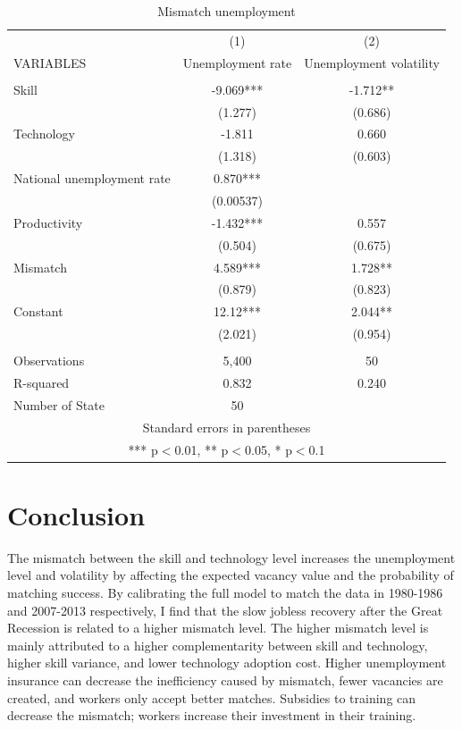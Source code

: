 \documentclass[12pt]{article}
\newcommand{\1}{\mathbb{1}}
\begin{document}
\begin{table}[h!]
\centering
\caption{Mismatch unemployment}
\label{unemployment}
\begin{tabular}{lcc} \hline \hline
 & (1) & (2) \\
VARIABLES & Unemployment rate & Unemployment volatility \\ \hline
 &  &  \\
Skill & -9.069*** & -1.712** \\
 & (1.277) & (0.686) \\
Technology & -1.811 & 0.660 \\
 & (1.318) & (0.603) \\
National unemployment rate & 0.870*** &  \\
 & (0.00537) &  \\
Productivity & -1.432*** & 0.557 \\
 & (0.504) & (0.675) \\
Mismatch & 4.589*** & 1.728** \\
 & (0.879) & (0.823) \\
Constant & 12.12*** & 2.044** \\
 & (2.021) & (0.954) \\
 &  &  \\
Observations & 5,400 & 50 \\
R-squared & 0.832 & 0.240 \\
 Number of State & 50 &  \\ \hline
\multicolumn{3}{c}{ Standard errors in parentheses} \\
\multicolumn{3}{c}{ *** p$<$0.01, ** p$<$0.05, * p$<$0.1} \\
\end{tabular}
\end{table}

\clearpage
\section{Conclusion}
The mismatch between the skill and technology level increases the unemployment level and volatility by affecting the expected vacancy value and the probability of matching success. By calibrating the full model to match the data in 1980-1986 and 2007-2013 respectively, I find that the slow jobless recovery after the Great Recession is related to a higher mismatch level. The higher mismatch level is mainly attributed to a higher complementarity between skill and technology, higher skill variance, and lower technology adoption cost. Higher unemployment insurance can decrease the inefficiency caused by mismatch, fewer vacancies are created, and workers only accept better matches. Subsidies to training can decrease the mismatch; workers increase their investment in their training. 

\clearpage


\end{document}
